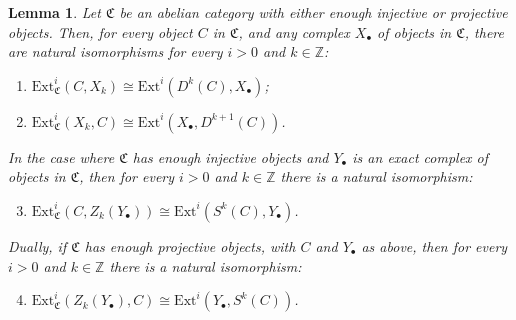 \documentclass[10pt,reqno]{amsart}
\numberwithin{equation}{section}
\newtheorem{lemma}[definition]{Lemma}
\theoremstyle{remark}
\newcommand{\Ext}{\mathrm{Ext}}
\newcommand{\C}{\mathfrak{C}}
\begin{document}
\begin{lemma}\label{lem:GilExt}
Let $\mathfrak{C}$ be an abelian category with either enough injective or projective objects. Then, for every object $C$ in $\mathfrak{C}$, and any complex $X_\bullet$ of objects in $\mathfrak{C}$, there are natural isomorphisms for every $i > 0$ and $k \in \mathbb{Z}$:
\begin{enumerate}[(1)]
\item $\Ext^i_{\C}(C,X_k) \cong \Ext^i(D^k(C),X_\bullet)$; 

\item $\Ext^i_{\C}(X_k,C) \cong \Ext^i(X_\bullet, D^{k+1}(C))$.
\end{enumerate}
In the case where $\mathfrak{C}$ has enough injective objects and $Y_\bullet$ is an exact complex of objects in $\mathfrak{C}$, then for every $i > 0$ and $k \in \mathbb{Z}$ there is a natural isomorphism:
\begin{enumerate}[(1)]
\setcounter{enumi}{2}
\item $\Ext^i_{\C}(C,Z_k(Y_\bullet)) \cong \Ext^i(S^k(C),Y_\bullet)$.
\end{enumerate} 
Dually, if $\mathfrak{C}$ has enough projective objects, with $C$ and $Y_\bullet$ as above, then for every $i > 0$ and $k \in \mathbb{Z}$ there is a natural isomorphism:
\begin{enumerate}[(1)]
\setcounter{enumi}{3}
\item $\Ext^i_{\C}(Z_k(Y_\bullet),C) \cong \Ext^i(Y_\bullet,S^k(C))$. \\
\end{enumerate} 
\end{lemma}
\end{document}
